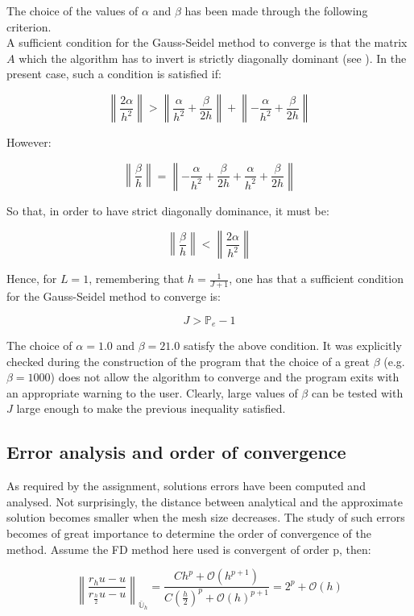 \documentclass[11pt]{article}
\theoremstyle{theorem}
\theoremstyle{definition}
\begin{document}
The choice of the values of $\alpha$ and $\beta$ has been made through the following criterion.\\
A sufficient condition for the Gauss-Seidel method to converge is that the matrix $A$ which the algorithm has to invert is strictly diagonally dominant (see \cite{numerical-math}). In the present case, such a condition is satisfied if:

$$\left\|\frac{2\alpha}{h^2}\right\|> \left\|\frac{\alpha}{h^2}+\frac{\beta}{2h}\right\| + \left\|-\frac{\alpha}{h^2}+\frac{\beta}{2h}\right\|$$

However:

$$\left\|\frac{\beta}{h}\right\|= \left\|-\frac{\alpha}{h^2}+\frac{\beta}{2h}+\frac{\alpha}{h^2}+\frac{\beta}{2h}\right\|$$

So that, in order to have strict diagonally dominance, it must be:

$$\left\|\frac{\beta}{h}\right\|<\left\|\frac{2\alpha}{h^2}\right\|$$

Hence, for $L=1$, remembering that $h=\frac{1}{J+1}$, one has that a sufficient condition for the Gauss-Seidel method to converge is:

$$J>\mathbb{P}_e-1$$

The choice of $\alpha=1.0$ and $\beta=21.0$ satisfy the above condition. It was explicitly checked during the construction of the program that the choice of a great $\beta$ (e.g. $\beta=1000$) does not allow the algorithm to converge and the program exits with an appropriate warning to the user. Clearly, large values of $\beta$ can be tested with $J$ large enough to make the previous inequality satisfied.\\

\subsection{Error analysis and order of convergence}
\label{subsec:Error}
As required by the assignment, solutions errors have been computed and analysed. Not surprisingly, the distance between analytical and the approximate solution becomes smaller when the mesh size decreases. The study of such errors becomes of great importance to determine the order of convergence of the method. Assume the FD method here used is convergent of order p, then:

$$\left\|\frac{r_hu-u}{r_{\frac{h}{2}}u-u}\right\|_{\bar{\mathbb{U}}_h}=\frac{Ch^p+\mathcal{O}(h^{p+1})}{C\left(\frac{h}{2}\right)^p+\mathcal{O}(h)^{p+1}}= 2^p+\mathcal{O}(h)$$
\end{document}
